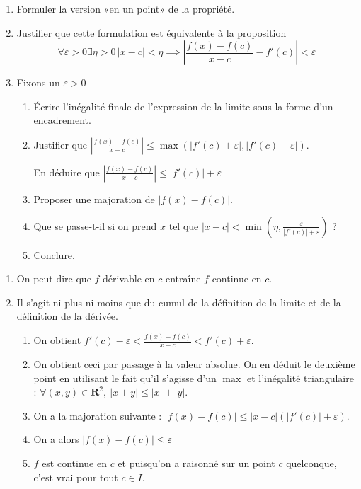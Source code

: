\documentclass[12pt,a4paper,french]{article}
\newcommand{\R}{\mathbf{R}}
\newcommand{\abs}[1]{\left\lvert #1 \right\rvert}
\theoremstyle{break}
\theoremstyle{plain}
\theoremstyle{nonumberplain}
\theoremstyle{nonumberbreak}
\begin{document}
\begin{question}[name=Démonstration]
  \begin{enumerate}
    \item Formuler la version «en un point» de la propriété.
    \item Justifier que cette formulation est équivalente à la
      proposition \[ \forall \varepsilon > 0 \exists \eta > 0 \, \abs{x
        - c} < \eta \implies \abs{\frac{f(x) - f(c)}{x - c} - f'(c)} <
      \varepsilon \]
    \item Fixons un $\varepsilon > 0$
      \begin{enumerate}
        \item Écrire l'inégalité finale de l'expression de la limite
          sous la forme d'un encadrement.
        \item Justifier que $\abs{\frac{f(x) - f(c)}{x - c}} \leqslant
          \max\left(\abs{f'(c) + \varepsilon},\abs{f'(c) -
          \varepsilon}\right)$.

          En déduire que $\abs{\frac{f(x) - f(c)}{x - c}} \leqslant
          \abs{f'(c)} + \varepsilon$
        \item Proposer une majoration de $\abs{f(x) - f(c)}$.
        \item Que se passe-t-il si on prend $x$ tel que $\abs{x-c} <
          \min\left(\eta,\frac{\varepsilon}{\abs{f'(c)} + \varepsilon}
            \right)$ ?
        \item Conclure.
      \end{enumerate}
  \end{enumerate}
\end{question}
\begin{solution}
  \begin{enumerate}
    \item On peut dire que $f$ dérivable en $c$ entraîne $f$ continue en
      $c$.
    \item Il s'agit ni plus ni moins que du cumul de la définition de la
      limite et de la définition de la dérivée.
      \begin{enumerate}
        \item On obtient $f'(c) - \varepsilon < \frac{f(x) - f(c)}{x -
          c} < f'(c) + \varepsilon$.
        \item On obtient ceci par passage à la valeur absolue. On en
          déduit le deuxième point en utilisant le fait qu'il s'agisse
          d'un $\max$ et l'inégalité triangulaire : $\forall (x,y) \in
          \R^2,\ \abs{x+y} \leqslant \abs{x} + \abs{y}$.
        \item On a la majoration suivante : $\abs{f(x) - f(c)} \leqslant
          \abs{x - c}\left(\abs{f'(c)}+\varepsilon\right)$.
        \item On a alors $\abs{f(x) - f(c)} \leqslant \varepsilon$
        \item $f$ est continue en $c$ et puisqu'on a raisonné sur un
          point $c$ quelconque, c'est vrai pour tout $c\in I$.
      \end{enumerate}
  \end{enumerate}
\end{solution}
\end{document}
